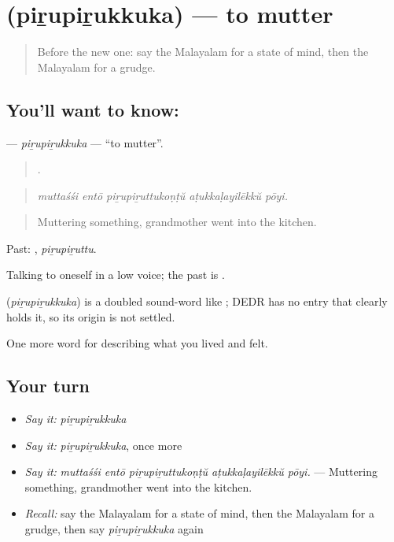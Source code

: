 \section[\texorpdfstring{\ml{പിറുപിറുക്കുക} (piṟupiṟukkuka)}{പിറുപിറുക്കുക (piṟupiṟukkuka)}]{ (piṟupiṟukkuka) — to mutter}

\label{lesson:ML-C523-pirupirukkuka}



\begin{quote}
Before the new one: say the Malayalam for a state of mind, then the Malayalam for a grudge.
\end{quote}

\subsection*{You'll want to know: }
\textbf{} — \emph{piṟupiṟukkuka} — \textquotedblleft{}to mutter\textquotedblright{}.

\begin{quote}
    .
\end{quote}

\begin{quote}
\emph{muttaśśi entō piṟupiṟuttukoṇṭŭ aṭukkaḷayilēkkŭ pōyi.}
\end{quote}

\begin{quote}
Muttering something, grandmother went into the kitchen.
\end{quote}

Past: , \emph{piṟupiṟuttu}.

Talking to oneself in a low voice; the past is .

\begin{cousinweb}
\textbf{} (\emph{piṟupiṟukkuka}) is a doubled sound-word like ; DEDR has no entry that clearly holds it, so its origin is not settled.
\end{cousinweb}

\begin{grammarlens}[title={What you've built}]
One more word for describing what you lived and felt.
\end{grammarlens}

\subsection*{Your turn}
\begin{itemize}
\raggedright
  \item \emph{Say it:} \emph{piṟupiṟukkuka}
  \item \emph{Say it:} \emph{piṟupiṟukkuka}, once more
  \item \emph{Say it:} \emph{muttaśśi entō piṟupiṟuttukoṇṭŭ aṭukkaḷayilēkkŭ pōyi.} — Muttering something, grandmother went into the kitchen.
  \item \emph{Recall:} say the Malayalam for a state of mind, then the Malayalam for a grudge, then say \emph{piṟupiṟukkuka} again
\end{itemize}

